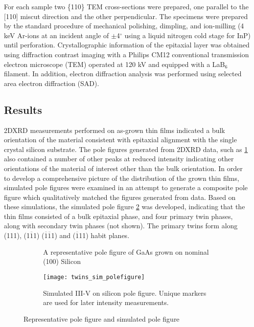 For each sample two \{110\} TEM cross-sections were prepared, one parallel to 
the [110] miscut direction and the other perpendicular. The specimens were 
prepared by the standard procedure of mechanical polishing, dimpling, and 
ion-milling (4 keV Ar-ions at an incident angle of $\pm$4$^\circ$ using a 
liquid nitrogen cold stage for InP) until perforation. Crystallographic 
information of the epitaxial layer was obtained using diffraction contrast 
imaging with a Philips CM12 conventional transmission electron microscope 
(TEM) operated at 120 kV and equipped with a LaB$_6$ filament. In addition, 
electron diffraction analysis was performed using selected area electron 
diffraction (SAD).
\subsection{Results}
2DXRD measurements performed on as-grown thin films indicated a bulk 
orientation of the material consistent with epitaxial alignment with the 
single crystal silicon substrate. The pole figures generated from 2DXRD data, 
such as \cref{fig:twins_pole_example} also contained a number of other peaks 
at reduced intensity indicating other orientations of the material of interest 
other than the bulk orientation. In order to develop a comprehensive picture 
of the distribution of the grown thin films, simulated pole figures were 
examined in an attempt to generate a composite pole figure which qualitatively 
matched the figures generated from data. Based on these simulations, the 
simulated pole figure \cref{fig:twins_sim_polefigure} was developed, 
indicating that the thin films consisted of a bulk epitaxial phase, and four 
primary twin phases, along with secondary twin phases (not shown). The primary twins form 
along (111), (1$\overline{1}$1) ($\overline{1}\overline{1}$1) and ($\overline{1}$11) 
habit planes.
\begin{figure}
    \begin{subfigure}[b]{0.5\linewidth}
        \centering
        \caption{A representative pole figure of GaAs grown on nominal (100) 
        Silicon\label{fig:twins_pole_example}}
    \end{subfigure}
    \begin{subfigure}[b]{0.5\linewidth}
        \centering
        \texttt{[image: twins\_sim\_polefigure]}
        \caption{Simulated III-V on silicon pole figure. Unique markers are used 
        for later intensity measurements.\label{fig:twins_sim_polefigure}}
    \end{subfigure}
    \caption{\label{fig:polefigure_example}Representative pole figure and simulated pole 
    figure}
\end{figure}

